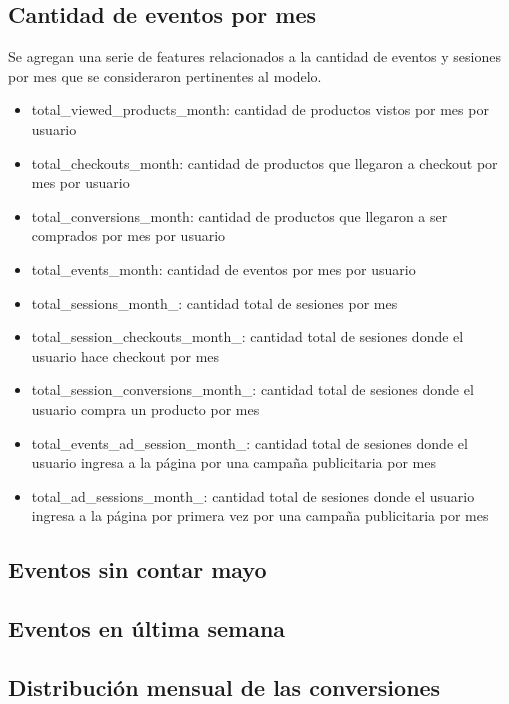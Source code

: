\documentclass[a4paper]{article}
\begin{document}
\subsection{Cantidad de eventos por mes}

Se agregan una serie de features relacionados a la cantidad de eventos y sesiones por mes que se consideraron pertinentes al modelo.

\begin{itemize}
	\item total\_viewed\_products\_month: cantidad de productos vistos por mes por usuario
	\item total\_checkouts\_month: cantidad de productos que llegaron a checkout por mes por usuario
	\item total\_conversions\_month: cantidad de productos que llegaron a ser comprados por mes por usuario
	\item total\_events\_month: cantidad de eventos por mes por usuario
	\item total\_sessions\_month\_: cantidad total de sesiones por mes
	\item total\_session\_checkouts\_month\_: cantidad total de sesiones donde el usuario hace checkout por mes
	\item total\_session\_conversions\_month\_: cantidad total de sesiones donde el usuario compra un producto por mes
	\item total\_events\_ad\_session\_month\_: cantidad total de sesiones donde el usuario ingresa a la página por una campaña publicitaria por mes
	\item total\_ad\_sessions\_month\_: cantidad total de sesiones donde el usuario ingresa a la página por primera vez por una campaña publicitaria por mes
	 
\end{itemize}

\subsection{Eventos sin contar mayo}

\subsection{Eventos en última semana}

\subsection{Distribución mensual de las conversiones}
\end{document}
